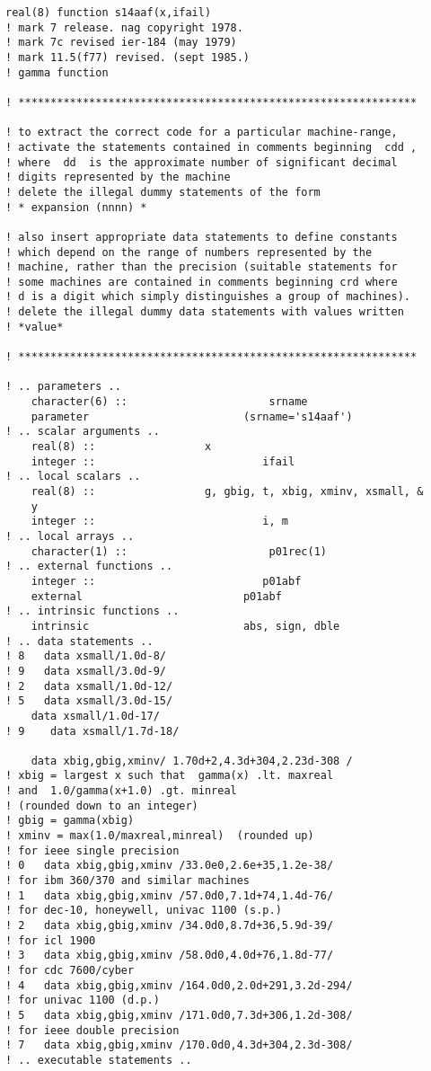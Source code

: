 \documentclass[12pt]{article}
\begin{document}
\begin{lstlisting}[frame=single,caption={{\tt d01b.f90}},label=d01b]
    real(8) function s14aaf(x,ifail)
! mark 7 release. nag copyright 1978.
! mark 7c revised ier-184 (may 1979)
! mark 11.5(f77) revised. (sept 1985.)
! gamma function

! **************************************************************

! to extract the correct code for a particular machine-range,
! activate the statements contained in comments beginning  cdd ,
! where  dd  is the approximate number of significant decimal
! digits represented by the machine
! delete the illegal dummy statements of the form
! * expansion (nnnn) *

! also insert appropriate data statements to define constants
! which depend on the range of numbers represented by the
! machine, rather than the precision (suitable statements for
! some machines are contained in comments beginning crd where
! d is a digit which simply distinguishes a group of machines).
! delete the illegal dummy data statements with values written
! *value*

! **************************************************************

! .. parameters ..
    character(6) ::                      srname
    parameter                        (srname='s14aaf')
! .. scalar arguments ..
    real(8) ::                 x
    integer ::                          ifail
! .. local scalars ..
    real(8) ::                 g, gbig, t, xbig, xminv, xsmall, &
    y
    integer ::                          i, m
! .. local arrays ..
    character(1) ::                      p01rec(1)
! .. external functions ..
    integer ::                          p01abf
    external                         p01abf
! .. intrinsic functions ..
    intrinsic                        abs, sign, dble
! .. data statements ..
! 8   data xsmall/1.0d-8/
! 9   data xsmall/3.0d-9/
! 2   data xsmall/1.0d-12/
! 5   data xsmall/3.0d-15/
    data xsmall/1.0d-17/
! 9    data xsmall/1.7d-18/

    data xbig,gbig,xminv/ 1.70d+2,4.3d+304,2.23d-308 /
! xbig = largest x such that  gamma(x) .lt. maxreal
! and  1.0/gamma(x+1.0) .gt. minreal
! (rounded down to an integer)
! gbig = gamma(xbig)
! xminv = max(1.0/maxreal,minreal)  (rounded up)
! for ieee single precision
! 0   data xbig,gbig,xminv /33.0e0,2.6e+35,1.2e-38/
! for ibm 360/370 and similar machines
! 1   data xbig,gbig,xminv /57.0d0,7.1d+74,1.4d-76/
! for dec-10, honeywell, univac 1100 (s.p.)
! 2   data xbig,gbig,xminv /34.0d0,8.7d+36,5.9d-39/
! for icl 1900
! 3   data xbig,gbig,xminv /58.0d0,4.0d+76,1.8d-77/
! for cdc 7600/cyber
! 4   data xbig,gbig,xminv /164.0d0,2.0d+291,3.2d-294/
! for univac 1100 (d.p.)
! 5   data xbig,gbig,xminv /171.0d0,7.3d+306,1.2d-308/
! for ieee double precision
! 7   data xbig,gbig,xminv /170.0d0,4.3d+304,2.3d-308/
! .. executable statements ..


\end{lstlisting}
\end{document}
